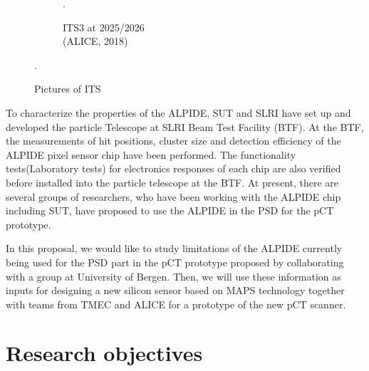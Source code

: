 \documentclass[12pt,a4paper]{article}
\begin{document}
\begin{figure}[hbt]
\begin{subfigure}[b]{0.3\textwidth}
        \caption{\centering ITS3 at 2025/2026 \\(ALICE, 2018)}.
        \label{fig:ITS3}
    \end{subfigure}
    \caption{Pictures of ITS}\label{fig:ITS}.
\end{figure}

To characterize the properties of the ALPIDE, SUT and SLRI have set up and developed the particle Telescope at SLRI Beam Test Facility (BTF). At the BTF, the measurements of hit positions, cluster size and detection efficiency of the ALPIDE pixel sensor chip have been performed\cite{SLRIandALPIDE}. The functionality tests(Laboratory tests) for electronics responses of each chip are also verified before installed into the particle telescope at the BTF. At present, there are several groups of researchers, who have been working with the ALPIDE chip including SUT, have proposed to use the ALPIDE in the PSD for the pCT prototype.  

In this proposal, we would like to study limitations of  the ALPIDE currently being used for the PSD part in the pCT prototype proposed by collaborating with a group at University of Bergen. Then, we will use these information as inputs for  designing a new silicon sensor based on MAPS technology together with teams from TMEC and ALICE for a prototype of the new pCT scanner. 


\section{Research objectives}
\end{document}
